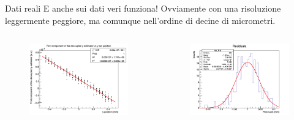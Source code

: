 \documentclass[
10pt,
aspectratio=169,
]{beamer}
\begin{document}
\begin{frame}{Dati reali}
E anche sui dati veri funziona! Ovviamente con una risoluzione leggermente peggiore, ma comunque nell'ordine di decine di micrometri.
        \begin{columns}
        \begin{figure}
            \centering
            \includegraphics[width=\textwidth]{y_fit_dati.png}
        \end{figure}
        \begin{figure}
            \centering
            \includegraphics[width=\textwidth]{y_res_dati.png}
        \end{figure}
    \end{columns}
\end{frame}
\end{document}
